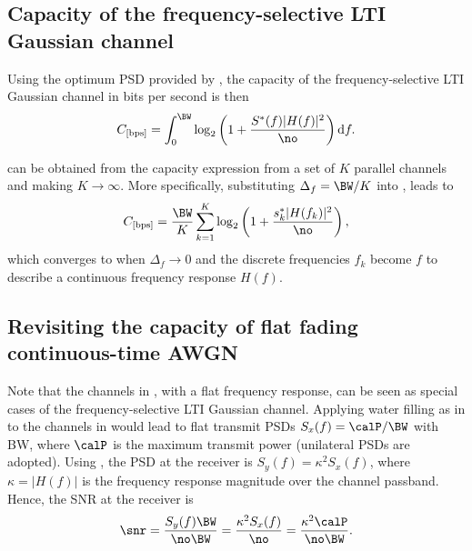 \subsection{Capacity of the frequency-selective LTI Gaussian channel}

Using the optimum PSD provided by , the capacity of the frequency-selective LTI Gaussian channel in bits per second is then
\begin{equation}
C_{[\textrm{bps}]} = \int_{0}^{\BW} \log_2 \left( 1 + \frac{S^*(f) |H(f)|^2}{\no} \right) \textrm{d}f.
\label{eq:frequencySelectiveCapacity}
\end{equation}

 can be obtained from the capacity expression from a set of $K$ parallel channels and making $K \rightarrow \infty$. More specifically, substituting $\Delta_f = \BW/K$ into , leads to
\begin{equation}
C_{[\textrm{bps}]} = \frac{\BW}{K} \sum_{k=1}^K \log_2 \left( 1 + \frac{s_k^* |H(f_k)|^2}{\no} \right),
\end{equation}
which converges to  when $\Delta_f \rightarrow 0 $ and the discrete frequencies $f_k$ become $f$ to describe a continuous frequency response $H(f)$.

\subsection{Revisiting the capacity of flat fading continuous-time AWGN}

Note that the channels in , with a flat frequency response, can be seen as special cases of the frequency-selective LTI Gaussian channel. Applying water filling as in  to the channels in  would lead to flat transmit PSDs $S_x(f) = \calP / \BW$ with BW, where $\calP$ is the maximum transmit power (unilateral PSDs are adopted). Using , the PSD at the receiver is $S_y(f) = \kappa^2 S_x(f)$, where $\kappa = |H(f)|$ is the frequency response magnitude over the channel passband.
Hence, the SNR at the receiver is
\begin{equation}
\snr = \frac{S_y(f) \BW}{ \no \BW} = \frac{\kappa^2 S_x(f)}{\no} = \frac{\kappa^2 \calP}{\no \BW }.
\label{eq:awgnSNRFromTx}
\end{equation}

